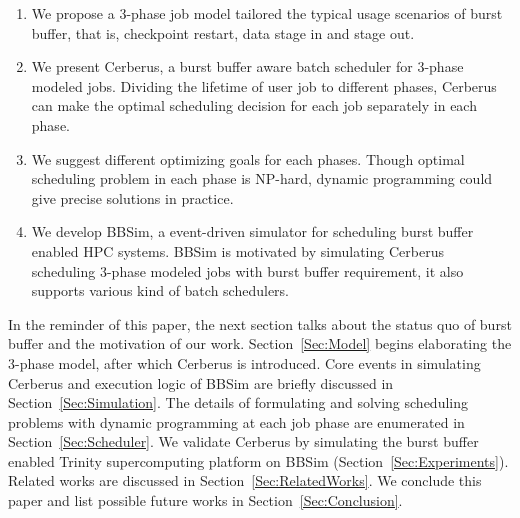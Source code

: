 \begin{enumerate}
        \item %
                We propose a 3-phase job model tailored the typical
                usage scenarios of burst buffer, that is, checkpoint restart,
                data stage in and stage out.
        \item   We present Cerberus,
                a burst buffer aware batch scheduler for 3-phase modeled jobs.
                Dividing the lifetime of user job to different phases,
                Cerberus can make the optimal scheduling decision 
                for each job separately in each phase.
        \item   We suggest different optimizing goals for each phases.
                Though optimal scheduling problem in each phase is NP-hard,
                dynamic programming could give precise solutions
                in practice.
        \item   We develop BBSim, a event-driven simulator for scheduling
                burst buffer enabled HPC systems.
                BBSim is motivated by simulating Cerberus scheduling 
                3-phase modeled jobs with burst buffer requirement,
                it also supports various kind of batch schedulers.
\end{enumerate}


In the reminder of this paper,
the next section talks about the status quo of burst buffer and
the motivation of our work.
Section~\ref{Sec:Model} begins elaborating the 3-phase model,
after which Cerberus is introduced.
Core events in simulating Cerberus and execution logic of BBSim are
briefly discussed in Section~\ref{Sec:Simulation}.
The details of formulating and solving scheduling problems with
dynamic programming at each job phase are enumerated in Section~\ref{Sec:Scheduler}.
We validate Cerberus by simulating the burst buffer enabled
Trinity supercomputing platform on BBSim (Section~\ref{Sec:Experiments}).
Related works are discussed in Section~\ref{Sec:RelatedWorks}.
We conclude this paper and list possible future works in Section~\ref{Sec:Conclusion}.

